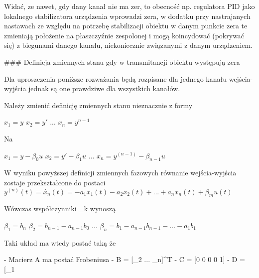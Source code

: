 \documentclass{article}
\begin{document}
	Widać, ze nawet, gdy dany kanał nie ma zer, to obecność np. regulatora PID jako lokalnego
	stabilizatora urządzenia wprowadzi zera, w dodatku przy nastrajanych nastawach
	ze względu na potrzebę stabilizacji obiektu w danym punkcie zera te zmieniają
	położenie na płaszczyźnie zespolonej i mogą koincydować (pokrywać się) z
	biegunami danego kanału, niekoniecznie związanymi z danym urządzeniem.

	### Definicja zmiennych stanu gdy w transmitancji obiektu występują zera

	Dla uproszczenia poniższe rozważania będą rozpisane dla jednego kanału
	wejścia-wyjścia jednak są one prawdziwe dla wszystkich kanałów.

	Należy zmienić definicję zmiennych stanu nieznacznie z formy

	$ x_{1} = y $
	$ x_{2} = y'$
	...
	$ x_{n} = y^{n-1}$

	Na

	$ x_{1} = y - \beta_{0}u $
	$ x_{2} = y' - \beta_{1}u$
	...
	$ x_{n} = y^{(n-1)} - \beta_{n-1}u$

	W wyniku powyższej definicji zmiennych fazowych równanie wejścia-wyjścia
	zostaje przekształcone do postaci
	$ y^{(n)}(t) = \dot{x_{n}}(t) = -a_{1}x_{1}(t) - a_{2}x_{2}(t) + ... + a_{n}x_{n}(t) + \beta_{m}u(t) $

	Wówczas współczynniki \beta_{k} wynoszą

	$ \beta_{1} = b_{n} $
	$ \beta_{2} = b_{n-1} - a_{n-1}b_{0}$
	...
	$ \beta_{n} = b_{1} - a_{n-1}b_{n-1} - ... - a_{1}b_{1}$

	Taki układ ma wtedy postać taką że

	- Macierz A ma postać Frobeniusa
	- B = [\beta_{2} ... \beta_{n}]^{T}
	- C = [0 0 0 0 1]
	- D = [\beta_{1}
\end{document}
